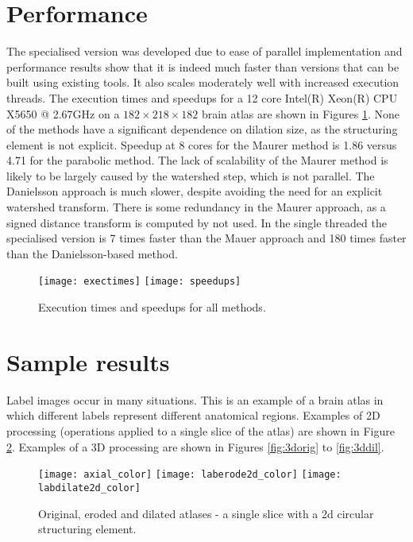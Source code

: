 \documentclass{InsightArticle}
\begin{document}
\section{Performance}
The specialised version was developed due to ease of parallel
implementation and performance results show that it is indeed much
faster than versions that can be built using existing tools. It also
scales moderately well with increased execution threads. The execution
times and speedups for a 12 core Intel(R) Xeon(R) CPU X5650 @ 2.67GHz
on a $182 \times 218 \times 182$ brain atlas are shown in Figures
\ref{fig:exec}. None of the methods have a
significant dependence on dilation size, as the structuring element is
not explicit. Speedup at 8 cores for the Maurer method is 1.86
versus 4.71 for the parabolic method. The lack of scalability of the
Maurer method is likely to be largely caused by the watershed step,
which is not parallel. The Danielsson approach is much slower, despite
avoiding the need for an explicit watershed transform. There is some
redundancy in the Maurer approach, as a signed distance transform is
computed by not used. In the single threaded the specialised version
is 7 times faster than the Mauer approach and 180 times faster than
the Danielsson-based method.

\begin{figure}[htbp]
\centering
\texttt{[image: exectimes]}
\texttt{[image: speedups]}
\caption{Execution times and speedups for all methods.\label{fig:exec}}
\end{figure}


\section{Sample results}
Label images occur in many situations. This is an example of a brain
atlas in which different labels represent different anatomical
regions. Examples of 2D processing (operations applied to a single
slice of the atlas) are shown in Figure \ref{fig:2d}. Examples of a 3D
processing are shown in Figures \ref{fig:3dorig} to \ref{fig:3ddil}.

\begin{figure}[htbp]
\centering
\texttt{[image: axial\_color]}
\texttt{[image: laberode2d\_color]}
\texttt{[image: labdilate2d\_color]}
\caption{Original, eroded and dilated atlases - a single slice with a 2d circular structuring element.\label{fig:2d}}
\end{figure}
\end{document}
